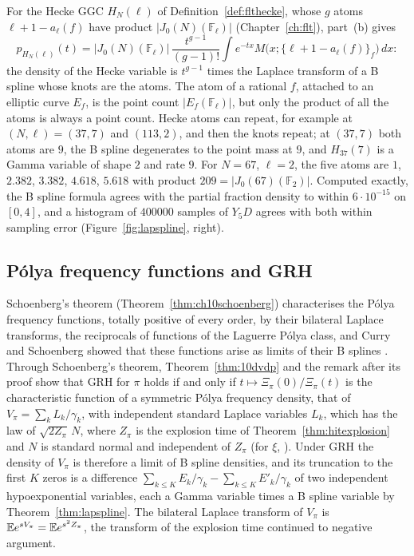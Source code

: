 For the Hecke GGC $H_N(\ell)$ of Definition~\ref{def:flthecke}, whose $g$ atoms $\ell+1-a_\ell(f)$ have product $|J_0(N)(\mathbb F_\ell)|$ (Chapter~\ref{ch:flt}), part~(b) gives
\[
p_{H_N(\ell)}(t)=|J_0(N)(\mathbb F_\ell)|\,\frac{t^{g-1}}{(g-1)!}\int e^{-tx}M\bigl(x;\{\ell+1-a_\ell(f)\}_f\bigr)\,dx :
\]
the density of the Hecke variable is $t^{g-1}$ times the Laplace transform of a B spline whose knots are the atoms. The atom of a rational $f$, attached to an elliptic curve $E_f$, is the point count $|E_f(\mathbb F_\ell)|$, but only the product of all the atoms is always a point count. Hecke atoms can repeat, for example at $(N,\ell)=(37,7)$ and $(113,2)$, and then the knots repeat; at $(37,7)$ both atoms are $9$, the B spline degenerates to the point mass at $9$, and $H_{37}(7)$ is a Gamma variable of shape $2$ and rate $9$. For $N=67$, $\ell=2$, the five atoms are $1$, $2.382$, $3.382$, $4.618$, $5.618$ with product $209=|J_0(67)(\mathbb F_2)|$. Computed exactly, the B spline formula agrees with the partial fraction density to within $6\cdot10^{-15}$ on $[0,4]$, and a histogram of $400000$ samples of $Y_5D$ agrees with both within sampling error (Figure~\ref{fig:lapspline}, right).

\subsection{P\'olya frequency functions and GRH}

Schoenberg's theorem (Theorem~\ref{thm:ch10schoenberg}) characterises the P\'olya frequency functions, totally positive of every order, by their bilateral Laplace transforms, the reciprocals of functions of the Laguerre P\'olya class, and Curry and Schoenberg showed that these functions arise as limits of their B splines \cite{curryschoenberg1966}. Through Schoenberg's theorem, Theorem~\ref{thm:10dvdp} and the remark after its proof show that GRH for $\pi$ holds if and only if $t\mapsto\Xi_\pi(0)/\Xi_\pi(t)$ is the characteristic function of a symmetric P\'olya frequency density, that of $V_\pi=\sum_kL_k/\gamma_k$, with independent standard Laplace variables $L_k$, which has the law of $\sqrt{2Z_\pi}\,N$, where $Z_\pi$ is the explosion time of Theorem~\ref{thm:hitexplosion} and $N$ is standard normal and independent of $Z_\pi$ (for $\xi$, \cite{roynetteyor2005,polson2018vdp,konstantopoulospatiesarkar2024}). Under GRH the density of $V_\pi$ is therefore a limit of B spline densities, and its truncation to the first $K$ zeros is a difference $\sum_{k\le K}E_k/\gamma_k-\sum_{k\le K}E'_k/\gamma_k$ of two independent hypoexponential variables, each a Gamma variable times a B spline variable by Theorem~\ref{thm:lapspline}. The bilateral Laplace transform of $V_\pi$ is $\mathbb{E} e^{sV_\pi}=\mathbb{E} e^{s^2Z_\pi}$, the transform of the explosion time continued to negative argument.

